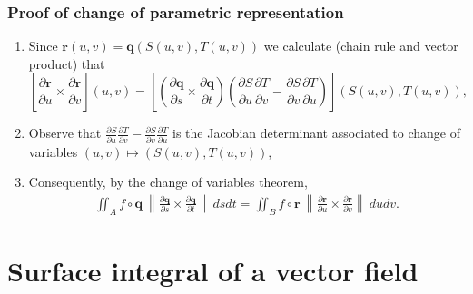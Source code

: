 \documentclass[aspectratio=169]{beamer}
\newcommand{\norm}[1]{\left\|#1\right\|} %
\newcommand{\rr}{\mathbf{r}}
\begin{document}
\begin{frame}
    \frametitle{Proof of change of parametric representation}

    \begin{enumerate}
        \item Since \(\rr(u,v) = \mathbf{q}(S(u,v),T(u,v))\) we calculate (chain rule and vector product) that
              \[
                  \left[\frac{\partial \rr}{\partial u} \times  \frac{\partial \rr}{\partial v}\right]
                  (u,v)
                  =
                  \left[
                  \left(\frac{\partial \mathbf{q}}{\partial s} \times \frac{\partial \mathbf{q}}{\partial t}\right)
                  \left(\frac{\partial S}{\partial u} \frac{\partial T}{\partial v} -  \frac{\partial S}{\partial v} \frac{\partial T}{\partial u} \right)  \right]
                  (S(u,v),T(u,v)),
              \]
        \item Observe that \(\frac{\partial S}{\partial u} \frac{\partial T}{\partial v} -  \frac{\partial S}{\partial v} \frac{\partial T}{\partial u}\) is the Jacobian determinant associated to change of variables \((u,v) \mapsto  (S(u,v),T(u,v)) \),
        \item Consequently, by the change of variables theorem,
              \begin{multline*}
                  \iint_{A} f \circ \mathbf{q} \ \norm{\frac{\partial  \mathbf{q} }{\partial s} \times \frac{\partial  \mathbf{q} }{\partial t}} \ ds dt
                  =
                  \iint_{B} f \circ \mathbf{r} \  \norm{\frac{\partial  \mathbf{r} }{\partial u} \times \frac{\partial  \mathbf{r} }{\partial v}} \ du dv.
              \end{multline*}
    \end{enumerate}


\end{frame}


\section{Surface integral of a vector field}
\end{document}
